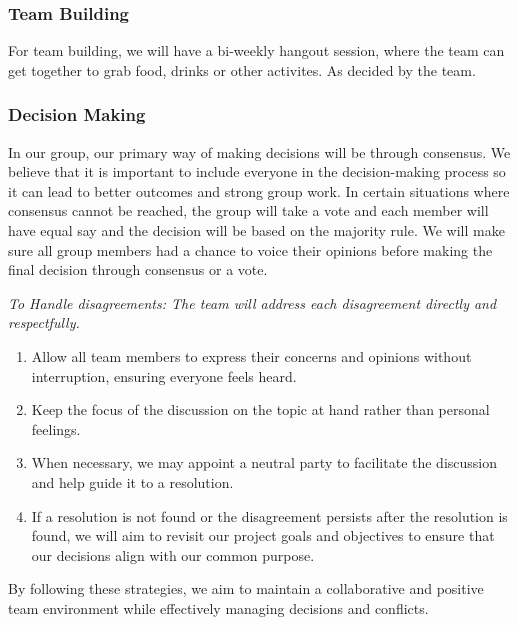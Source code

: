 \documentclass{article}
\begin{document}
\subsubsection*{Team Building}

For team building, we will have a bi-weekly hangout session, where the team can get together to grab food, drinks or other activites. As decided by the team.
\subsubsection*{Decision Making} 

In our group, our primary way of making decisions will be through
consensus. We believe that it is important
to include everyone in the decision-making process so it can lead to
better outcomes and strong group work.
In certain situations where consensus cannot be reached, the group
will take a vote and each member will have
equal say and the decision will be based on the majority rule. We
will make sure all group members had a chance
to voice their opinions before making the final decision through
consensus or a vote.

\vspace{10pt}
\textit{To Handle disagreements: The team will address each
disagreement directly and respectfully.}

\begin{enumerate}
  \item Allow all team members to express their concerns and opinions
    without interruption, ensuring everyone
    feels heard.
  \item Keep the focus of the discussion on the topic at hand rather
    than personal feelings.
  \item When necessary, we may appoint a neutral party to facilitate
    the discussion and help guide it to a resolution.
  \item If a resolution is not found or the disagreement persists
    after the resolution is found, we will aim to
    revisit our project goals and objectives to ensure that our
    decisions align with our common purpose.
\end{enumerate}
By following these strategies, we aim to maintain a collaborative and
positive team environment while effectively
managing decisions and conflicts.
\end{document}
